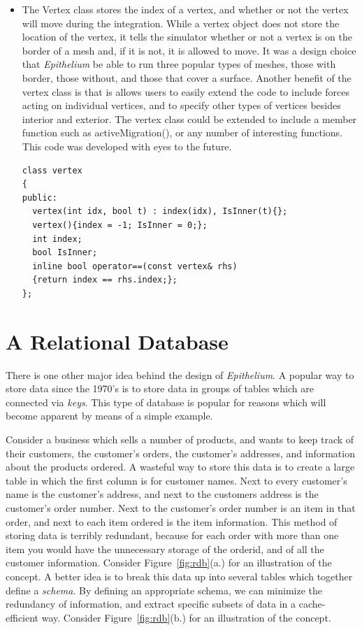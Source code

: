 \begin{itemize}
\begin{lstlisting}
\end{lstlisting}

\item The {\color{green} Vertex} class stores the index of a vertex, and 
whether or not the vertex will move during the integration. While a 
vertex object does not store the location of the vertex, it tells the 
simulator whether or not a vertex is on the border of a mesh and, if it 
is not, it is allowed to move. It was a design choice that 
\emph{Epithelium} be able to run three popular types of meshes, those 
with border, those without, and those that cover a surface.  Another 
benefit of the vertex class is that is allows users to easily extend 
the code to include forces acting on individual vertices, and to 
specify other types of vertices besides interior and exterior. The 
vertex class could be extended to include a member function such as 
activeMigration(), or any number of interesting functions. This code was developed with eyes to the future. 
\begin{lstlisting}
class vertex
{
public:
  vertex(int idx, bool t) : index(idx), IsInner(t){};
  vertex(){index = -1; IsInner = 0;};
  int index;
  bool IsInner;
  inline bool operator==(const vertex& rhs)
  {return index == rhs.index;};
};
\end{lstlisting}
\end{itemize}


\section{A Relational Database}
There is one other major idea behind the design of \emph{Epithelium}. A 
popular way to store data since the 1970's is to store data in groups of tables which are connected via \emph{keys}. This type of database is popular for reasons which will become apparent by means of a simple example. 

Consider a business which sells a number of products, and wants to keep 
track of their customers, the customer's orders, the customer's 
addresses, and information about the products ordered. A wasteful way 
to store this data is to create a large table in which the first column 
is for customer names. Next to every customer's name is the customer's 
address, and next to the customers address is the customer's order 
number. Next to the customer's order number is an item in that order, 
and next to each item ordered is the item information. This method of 
storing data is terribly redundant, because for each order with more 
than one item you would have the unnecessary storage of the orderid, and of all 
the customer information. Consider Figure~\ref{fig:rdb}(a.) for an illustration of the concept.
A better idea is to break this data up into several tables which 
together define a \emph{schema}. By defining an appropriate schema, we can minimize the redundancy of information, and extract specific subsets of data in a cache-efficient way. Consider Figure~\ref{fig:rdb}(b.) for an illustration of the concept.

